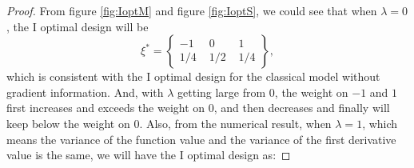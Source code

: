 \documentclass[preprint,12pt]{elsarticle}
\begin{document}
\begin{proof}
From figure \ref{fig:IoptM} and figure \ref{fig:IoptS}, we could see
that when $\lambda=0$, the I optimal design will be
$$\xi^*=\left\{\begin{array}{ccc}-1\,\,&0\,\,&1\\1/4\,\,&1/2\,\,&1/4\end{array}\right\},$$
which is consistent with the I optimal design for the classical
model without gradient information. And, with $\lambda$ getting
large from $0$, the weight on $-1$ and $1$ first increases and
exceeds the weight on $0$, and then decreases and finally will keep
below the weight on $0$. Also, from the numerical result, when
$\lambda=1$, which means the variance of the function value and the
variance of the first derivative value is the same, we will have the
I optimal design as:












\end{proof}















\end{document}
